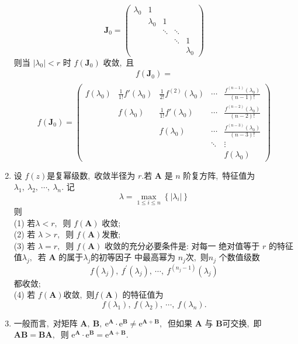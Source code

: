\begin{enumerate}
		$$\boldsymbol{J}_{0}=\left(\begin{array}{ccccc}
			\lambda_{0} & 1 & & & \\
			& \lambda_{0} & 1 & & \\
			& & \ddots & \ddots & \\
			& & & \ddots & 1 \\
			& & & & \lambda_{0}
		\end{array}\right)$$
		则当  $\left|\lambda_{0}\right|<r $ 时  $f\left(\boldsymbol{J}_{0}\right) $ 收敛,\  且
		$$\begin{array}{l}
			f\left(\boldsymbol{J}_{0}\right)= \\
		\end{array}$$
		$$f\left(\boldsymbol{J}_{0}\right)=\left(\begin{array}{ccccc}
			f(\lambda_{0}) & \frac{1}{1!}f'(\lambda_{0}) &\frac{1}{2!}f^{(2)}(\lambda_{0}) &\cdots &\frac{f^{(n-1)}(\lambda_{0})}{(n-1)!} \\
			&f(\lambda_{0}) & \frac{1}{1!}f'(\lambda_{0}) &\cdots &\frac{f^{(n-2)}(\lambda_{0})}{(n-2)!} \\
			& & f(\lambda_{0}) & \cdots &\frac{f^{(n-3)}(\lambda_{0})}{(n-3)!}  \\
			& & & \ddots & \vdots \\
			& & & & f(\lambda_{0})
		\end{array}\right)$$
		\item 设  $f(z)  $是复幂级数,\  收敛半径为  $r . $若  $\boldsymbol{A}$  是  $n $ 阶复方阵,\  特征值为$  \lambda_{1},\  \lambda_{2},\  \cdots,\  \lambda_{n} .$ 记
		$$\lambda=\max _{1 \leqslant i \leqslant n}\left\{\left|\lambda_{i}\right|\right\}$$
		则\\
		(1) 若$  \lambda<r ,\ $ 则 $ f(\boldsymbol{A})$  收敛;\\
		(2) 若 $ \lambda>r ,\ $ 则  $f(\boldsymbol{A})$发散;\\
		(3) 若 $ \lambda=r ,\ $ 则 $ f(\boldsymbol{A})$  收敛的充分必要条件是: 对每一 绝对值等于  $r $ 的特征值$  \lambda_{j} ,\ $ 若 $ \boldsymbol{A} $ 的属于$  \lambda_{j}  $的初等因子 中最高幂为 $ n_{j}  $次,\  则$  n_{j} $ 个数值级数
		$$f\left(\lambda_{j}\right),\  f^{\prime}\left(\lambda_{j}\right),\  \cdots,\  f^{\left(n_{j}-1\right)}\left(\lambda_{j}\right)$$
		都收敛;\\
		(4) 若  $f(\boldsymbol{A})  $收敛,\  则$  f(\boldsymbol{A}) $ 的特征值为
		$$f\left(\lambda_{1}\right),\  f\left(\lambda_{2}\right),\  \cdots,\  f\left(\lambda_{n}\right) .$$
		\item 一般而言,\  对矩阵 $ \boldsymbol{A},\  \boldsymbol{B},\  \mathrm{e}^{\boldsymbol{A}} \cdot \mathrm{e}^{\boldsymbol{B}} \neq \mathrm{e}^{\boldsymbol{A}+\boldsymbol{B}} ,\ $ 但如果 $ \boldsymbol{A}$  与 $ \boldsymbol{B}  $可交换,\  即  $\boldsymbol{A B}=\boldsymbol{B} \boldsymbol{A} ,\ $ 则  $\mathrm{e}^{\boldsymbol{A}} \cdot \mathrm{e}^{\boldsymbol{B}}=\mathrm{e}^{\boldsymbol{A}+\boldsymbol{B}} .$

\end{enumerate}
